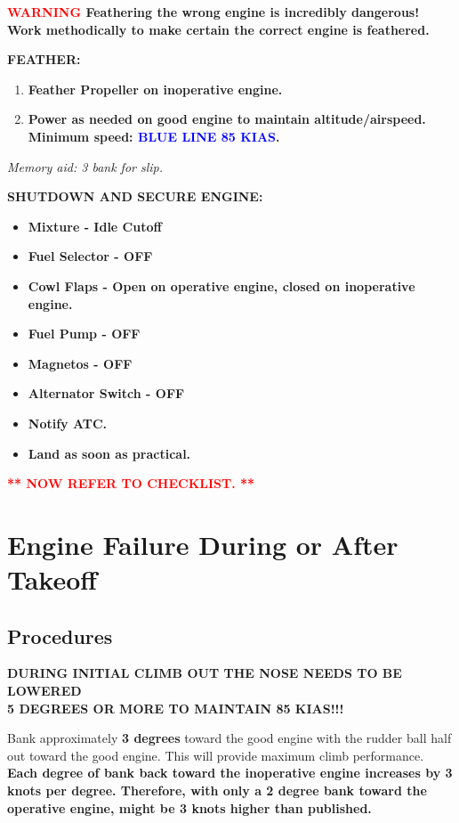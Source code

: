 \textbf{\textcolor{red}{WARNING} Feathering the wrong engine is incredibly dangerous!
Work methodically to make certain the correct engine is feathered.}

\textbf{FEATHER:}
\begin{enumerate}
    \item \textbf{Feather Propeller on inoperative engine.}
    \item \textbf{Power as needed on good engine to maintain altitude/airspeed.\\Minimum speed: \textcolor{blue}{BLUE LINE 85 KIAS}.}
\end{enumerate}

\emph{Memory aid: 3\degree{} bank for slip.}

\textbf{SHUTDOWN AND SECURE ENGINE:}
\begin{itemize}
    \item \textbf{Mixture - Idle Cutoff}
    \item \textbf{Fuel Selector - OFF}
    \item \textbf{Cowl Flaps - Open on operative engine, closed on inoperative engine.}
    \item \textbf{Fuel Pump - OFF}
    \item \textbf{Magnetos - OFF}
    \item \textbf{Alternator Switch - OFF}
    \item \textbf{Notify ATC.}
    \item \textbf{Land as soon as practical.}
\end{itemize}

\textbf{\textcolor{red}{** NOW REFER TO CHECKLIST. **}}


\section{Engine Failure During or After Takeoff}

\subsection{Procedures}

{\centering
\textbf{DURING INITIAL CLIMB OUT THE NOSE NEEDS TO BE LOWERED\\
5 DEGREES OR MORE TO MAINTAIN 85 KIAS!!!}
\par }

Bank approximately \textbf{3 degrees} toward the good engine with the rudder ball half out toward the good engine. This
will provide maximum climb performance. \textbf{Each degree of bank back toward the inoperative engine increases \vmc
by 3 knots per degree. Therefore, with only a 2 degree bank toward the operative engine, \vmc might be 3 knots higher
than published.}

